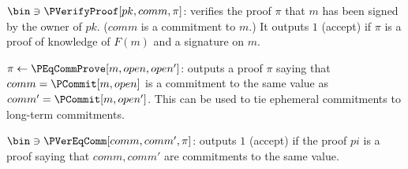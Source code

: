 
\(\bin\ni \PVerifyProof[pk, comm, \pi]\): verifies the proof \(\pi\) that \(m\) 
has been signed by the owner of \(pk\).
(\(comm\) is a commitment to \(m\).)
It outputs \(1\) (accept) if \(\pi\) is a proof of knowledge of \(F(m)\) and a 
signature on \(m\).


\(\pi\gets \PEqCommProve[m, open, open']\): outputs a proof \(\pi\) saying that 
\(comm = \PCommit[m, open]\) is a commitment to the same value as \(comm' = 
  \PCommit[m, open']\).
This can be used to tie ephemeral commitments to long-term commitments.


\(\bin\ni \PVerEqComm[comm, comm', \pi]\): outputs \(1\) (accept) if the proof 
\(pi\) is a proof saying that \(comm, comm'\) are commitments to the same value.
